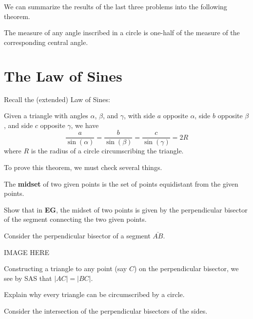 \documentclass[newpage,hints,handout]{ximera}
\begin{document}
We can summarize the results of the last three problems into the following theorem.

\begin{theorem}
\label{43}The measure of any angle inscribed in a circle is one-half of the
measure of the corresponding central angle.
\end{theorem}




\section{The Law of Sines}


Recall the (extended) Law of Sines:

\begin{theorem}
Given a triangle with angles $\alpha$, $\beta$, and $\gamma$, with
side $a$ opposite $\alpha$, side $b$ opposite $\beta$, and side $c$
opposite $\gamma$, we have
\[
\frac{a}{\sin(\alpha)} = \frac{b}{\sin(\beta)} = \frac{c}{\sin(\gamma)} = 2R  
\]
where $R$ is the radius of a circle circumscribing the triangle.
\end{theorem}

To prove this theorem, we must check several things. 

\begin{definition}
The \textbf{midset} of two given points is the set of points
equidistant from the given points.
\end{definition}

\begin{problem}
Show that in \textbf{EG}, the midset of two points is given by the
perpendicular bisector of the segment connecting the two given points.
\begin{freeResponse}
Consider the perpendicular bisector of a segment $\bar{AB}$.
\begin{image}
IMAGE HERE
\end{image}
Constructing a triangle to any point (say $C$) on the perpendicular
bisector, we see by SAS that $|AC|=|BC|$.
\end{freeResponse}
\end{problem}


\begin{problem}
Explain why every triangle can be circumscribed by a circle.
\begin{hint}
Consider the intersection of the perpendicular bisectors of the sides.
\end{hint}
\end{problem}
\end{document}
